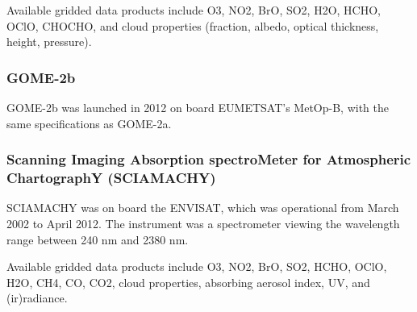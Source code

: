 Available gridded data products include O3, NO2, BrO, SO2, H2O, HCHO, OClO, CHOCHO, and cloud properties (fraction, albedo, optical thickness, height, pressure).

\subsubsection{GOME-2b}

GOME-2b was launched in 2012 on board EUMETSAT's MetOp-B, with the same specifications as GOME-2a.

\subsubsection{Scanning Imaging Absorption spectroMeter for Atmospheric ChartographY (SCIAMACHY)}

SCIAMACHY was on board the ENVISAT, which was operational from March 2002 to April 2012.
The instrument was a spectrometer viewing the wavelength range between 240 nm and 2380 nm. 

Available gridded data products include O3, NO2, BrO, SO2, HCHO, OClO, H2O, CH4, CO, CO2, cloud properties, absorbing aerosol index, UV, and (ir)radiance.


  
  
  